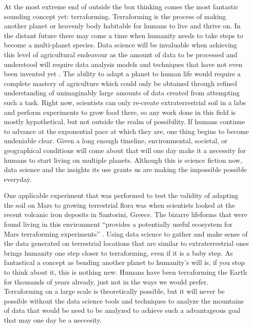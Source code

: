 \documentclass[sigconf]{acmart}
\begin{document}
At the most extreme end of outside the box thinking comes the most fantastic sounding concept yet: terraforming. Terraforming is the process of making another planet or heavenly body habitable for humans to live and thrive on. In the distant future there may come a time when humanity needs to take steps to become a multi-planet species. Data science will be invaluable when achieving this level of agricultural endeavour as the amount of data to be processed and understood will require data analysis models and techniques that have not even been invented yet \cite{dance2016}. The ability to adapt a planet to human life would require a complete mastery of agriculture which could only be obtained through refined understanding of unimaginably large amounts of data created from attempting such a task. Right now, scientists can only re-create extraterrestrial soil in a labs and perform experiments to grow food there, so any work done in this field is mostly hypothetical, but not outside the realm of possibility. If humans continue to advance at the exponential pace at which they are, one thing begins to become undeniable clear. Given a long enough timeline, environmental, societal, or geographical conditions will come about that will one day make it a necessity for humans to start living on multiple planets. Although this is science fiction now, data science and the insights its use grants us are making the impossible possible everyday.

One applicable experiment that was performed to test the validity of adapting the soil on Mars to growing terrestrial flora was when scientists looked at the recent volcanic iron deposits in Santorini, Greece. The bizarre lifeforms that were found living in this environment ``provides a potentially useful ecosystem for Mars terraforming experiments'' \cite{robbins2015}. Using data science to gather and make sense of the data generated on terrestrial locations that are similar to extraterrestrial ones brings humanity one step closer to terraforming, even if it is a baby step. As fantastical a concept as bending another planet to humanity's will is, if you stop to think about it, this is nothing new. Humans have been terraforming the Earth for thousands of years already, just not in the ways we would prefer. Terraforming on a large scale is theoretically possible, but it will never be possible without the data science tools and techniques to analyze the mountains of data that would be need to be analyzed to achieve such a advantageous goal that may one day be a neccesity.
\end{document}
